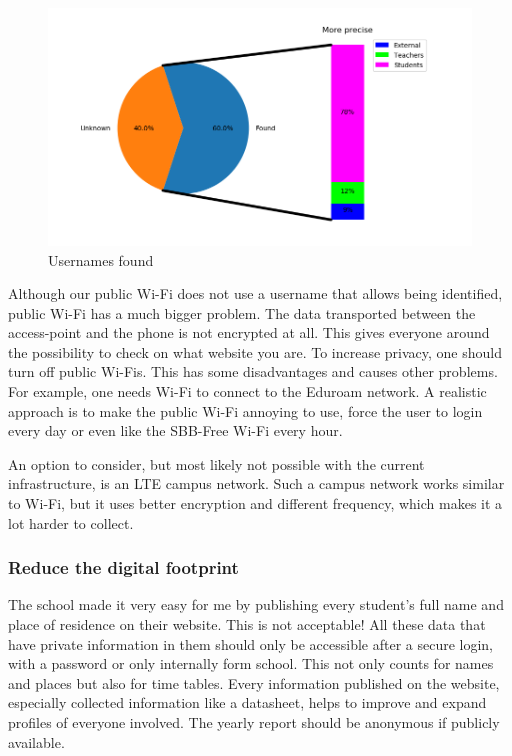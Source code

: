 \documentclass[paper=a4, fontsize=11pt]{article}
\begin{document}
\begin{figure}
\centering
\includegraphics [width = 12cm]{images/piecharwith_usernames.png}
\caption{Usernames found \label{usernames}}
\end{figure}

Although our public Wi-Fi does not use a username that allows being identified, public Wi-Fi has a much bigger problem. The data transported between the access-point and the phone is not encrypted at all. This gives everyone around the possibility to check on what website you are. To increase privacy, one should turn off public Wi-Fis. This has some disadvantages and causes other problems. For example, one needs Wi-Fi to connect to the Eduroam network. A realistic approach is to make the public Wi-Fi annoying to use, force the user to login every day or even like the SBB-Free Wi-Fi every hour.



An option to consider, but most likely not possible with the current infrastructure, is an LTE campus network.
Such a campus network works similar to Wi-Fi, but it uses better encryption and different frequency, which makes it a lot harder to collect.

\subsubsection{Reduce the digital footprint}

The school made it very easy for me by publishing every student's full name and place of residence on their website. This is not acceptable! All these data that have private information in them should only be accessible after a secure login, with a password or only internally form school. This not only counts for names and places but also for time tables. Every information published on the website, especially collected information like a datasheet, helps to improve and expand profiles of everyone involved. The yearly report should be anonymous if publicly available.
\end{document}
